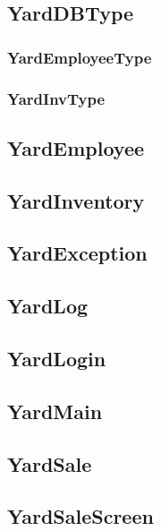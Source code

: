 \documentclass{report}
\begin{document}
	\subsection{YardDBType}

	\subsubsection{YardEmployeeType}

	\subsubsection{YardInvType}


	\subsection{YardEmployee}

	\subsection{YardInventory}

	\subsection{YardException}

	\subsection{YardLog}

	\subsection{YardLogin}

	\subsection{YardMain}

	\subsection{YardSale}

	\subsection{YardSaleScreen}
\end{document}
